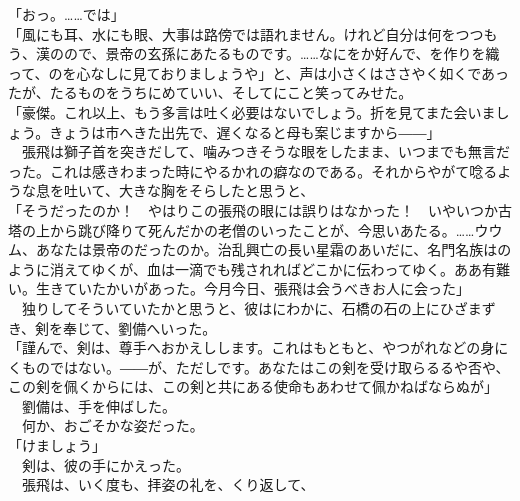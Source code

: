 \documentclass[
  paper=a5,
  fontsize=10pt,
  jafontsize=9.5pt,
  tate,                  %
  open_bracket_pos=nibu, %
]{jlreq}
\begin{document}
「おっ。……では」\\


「風にも耳、水にも眼、大事は路傍では語れません。けれど自分は何をつつもう、漢のので、景帝の玄孫にあたるものです。……なにをか好んで、を作りを織って、のを心なしに見ておりましょうや」と、声は小さくはささやく如くであったが、たるものをうちにめていい、そしてにこと笑ってみせた。\\


「豪傑。これ以上、もう多言は吐く必要はないでしょう。折を見てまた会いましょう。きょうは市へきた出先で、遅くなると母も案じますから――」\\


　張飛は獅子首を突きだして、噛みつきそうな眼をしたまま、いつまでも無言だった。これは感きわまった時にやるかれの癖なのである。それからやがて唸るような息を吐いて、大きな胸をそらしたと思うと、\\


「そうだったのか！　やはりこの張飛の眼には誤りはなかった！　いやいつか古塔の上から跳び降りて死んだかの老僧のいったことが、今思いあたる。……ウウム、あなたは景帝のだったのか。治乱興亡の長い星霜のあいだに、名門名族はのように消えてゆくが、血は一滴でも残されればどこかに伝わってゆく。ああ有難い。生きていたかいがあった。今月今日、張飛は会うべきお人に会った」\\


　独りしてそういていたかと思うと、彼はにわかに、石橋の石の上にひざまずき、剣を奉じて、劉備へいった。\\


「謹んで、剣は、尊手へおかえしします。これはもともと、やつがれなどの身にくものではない。――が、ただしです。あなたはこの剣を受け取らるるや否や、この剣を佩くからには、この剣と共にある使命もあわせて佩かねばならぬが」\\


　劉備は、手を伸ばした。\\


　何か、おごそかな姿だった。\\


「けましょう」\\


　剣は、彼の手にかえった。\\


　張飛は、いく度も、拝姿の礼を、くり返して、\\
\end{document}
